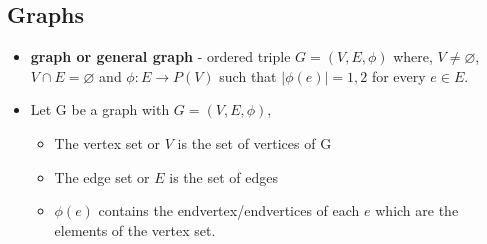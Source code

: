 \subsection{Graphs}
\begin{itemize}
 \item \textbf{graph or general graph} - ordered triple $G=(V,E,\phi)$ where, $V\neq\varnothing$, $V \cap E = \varnothing$ and $\phi:E \rightarrow P(V)$ such that $|\phi(e)|={1,2}$ for every $e \in E$.
 \item Let G be a graph with $G = (V,E,\phi)$,
	\begin{itemize}
		\item The vertex set or $V$ is the set of vertices of G
		\item The edge set or $E$ is the set of edges
		\item $\phi(e)$ contains the endvertex/endvertices of each $e$ which are the elements of the vertex set. 
	\end{itemize}	 
\begin{figure}[h]
\centering
{}
\end{figure}
\end{itemize}
